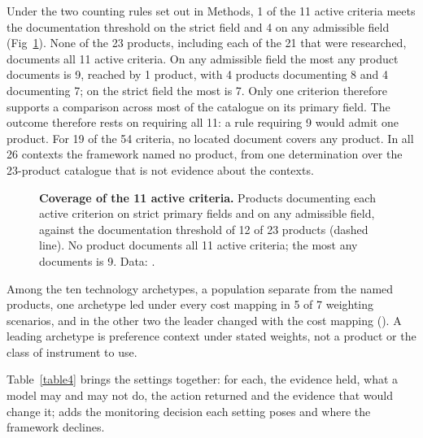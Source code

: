 \documentclass[10pt,letterpaper]{article}
\begin{document}
Under the two counting rules set out in Methods, 1 of the 11 active criteria meets the documentation threshold on the strict field and 4 on any admissible field (Fig~\ref{fig:documentation-threshold}). None of the 23 products, including each of the 21 that were researched, documents all 11 active criteria. On any admissible field the most any product documents is 9, reached by 1 product, with 4 products documenting 8 and 4 documenting 7; on the strict field the most is 7. Only one criterion therefore supports a comparison across most of the catalogue on its primary field. The outcome therefore rests on requiring all 11: a rule requiring 9 would admit one product. For 19 of the 54 criteria, no located document covers any product. In all 26 contexts the framework named no product, from one determination over the 23-product catalogue that is not evidence about the contexts.\label{callout:fig:documentation-threshold}

\begin{figure}[!ht]
\caption{\textbf{Coverage of the 11 active criteria.} Products documenting each active criterion on strict primary fields and on any admissible field, against the documentation threshold of 12 of 23 products (dashed line). No product documents all 11 active criteria; the most any documents is 9. Data: .}
\label{fig:documentation-threshold}
\end{figure}

Among the ten technology archetypes, a population separate from the named products, one archetype led under every cost mapping in 5 of 7 weighting scenarios, and in the other two the leader changed with the cost mapping (). A leading archetype is preference context under stated weights, not a product or the class of instrument to use.

Table~\ref{table4} brings the settings together: for each, the evidence held, what a model may and may not do, the action returned and the evidence that would change it;  adds the monitoring decision each setting poses and where the framework declines.\label{callout:table4}
\end{document}
